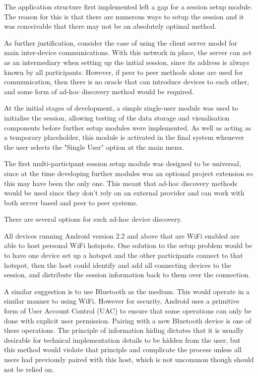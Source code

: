 The application structure first implemented left a gap for a session setup module. The reason for this is that there are numerous ways to setup the session and it was conceivable that there may not be an absolutely optimal method.

As further justification, consider the case of using the client server model for main inter-device communications. With this network in place, the server can act as an intermediary when setting up the initial session, since its address is always known by all participants. However, if peer to peer methods alone are used for communication, then there is no oracle that can introduce devices to each other, and some form of ad-hoc discovery method would be required.

At the initial stages of development, a simple single-user module was used to initialise the session, allowing testing of the data storage and visualisation components before further setup modules were implemented. As well as acting as a temporary placeholder, this module is activated in the final system whenever the user selects the "Single User" option at the main menu.

The first multi-participant session setup module was designed to be universal, since at the time developing further modules was an optional project extension so this may have been the only one.
This meant that ad-hoc discovery methods would be used since they don't rely on an external provider and can work with both server based and peer to peer systems.

There are several options for such ad-hoc device discovery.

All devices running Android version 2.2 and above that are WiFi enabled are able to host personal WiFi hotspots. One solution to the setup problem would be to have one device set up a hotspot and the other participants connect to that hotspot, then the host could identify and add all connecting devices to the session, and distribute the session information back to them over the connection.



A similar suggestion is to use Bluetooth as the medium. This would operate in a similar manner to using WiFi. However for security, Android uses a primitive form of User Account Control (UAC) to ensure that some operations can only be done with explicit user permission. Pairing with a new Bluetooth device is one of these operations.\cite{btUAC} The principle of information hiding dictates that it is usually desirable for technical implementation details to be hidden from the user, but this method would violate that principle and complicate the process unless all users had previously paired with this host, which is not uncommon though should not be relied on.

